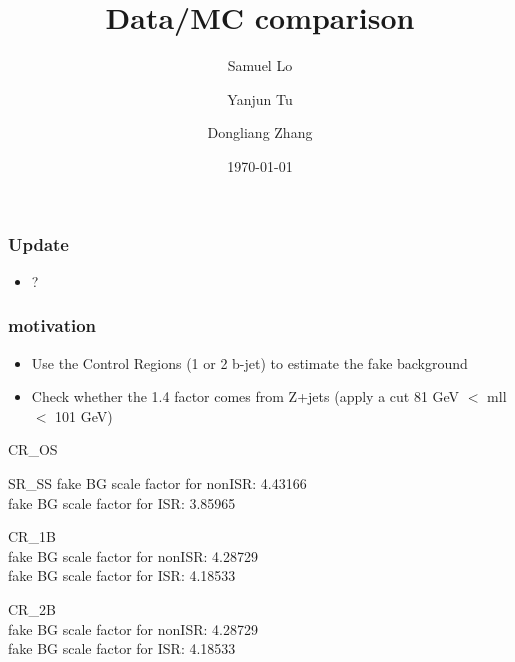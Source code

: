 \documentclass[mathserif,serif]{beamer}
\title{Data/MC comparison}
\author
{
Samuel Lo \inst{1}
\and
Yanjun Tu  \inst{1}
\and
Dongliang Zhang  \inst{2}
}
\institute
{
\inst{1}
The University of Hong Kong
\and
\inst{2}
University of Michigan
}
\date{\today}
\begin{document}
\frame{\titlepage}

\begin{frame}
\frametitle{Update}
\begin{itemize}
\item ?
\end{itemize}
\end{frame}

\begin{frame}
\frametitle{motivation}
\begin{itemize}
\item Use the Control Regions (1 or 2 b-jet) to estimate the fake background
\item Check whether the 1.4 factor comes from Z+jets (apply a cut 81 GeV $<$ mll $<$ 101 GeV)
\end{itemize}
\end{frame}

\begin{frame}
\begin{center}
\huge
CR\_OS
\end{center}
\end{frame}



\def \PathToPlot {../plot}


\begin{frame}
\begin{center}
\huge
SR\_SS
\small
fake BG scale factor for nonISR: 4.43166 \\
fake BG scale factor for ISR: 3.85965
\end{center}
\end{frame}





\begin{frame}
\begin{center}
\huge
CR\_1B \\
\small
fake BG scale factor for nonISR: 4.28729 \\
fake BG scale factor for ISR: 4.18533
\end{center}
\end{frame}







\begin{frame}
\begin{center}
\huge
CR\_2B \\
\small
fake BG scale factor for nonISR: 4.28729 \\
fake BG scale factor for ISR: 4.18533
\end{center}
\end{frame}
\end{document}

